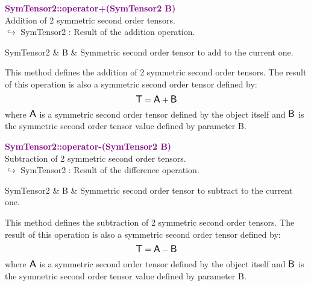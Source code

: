 \textcolor{purple}{\textbf{SymTensor2::operator+(SymTensor2 B)}}\label{SymTensor2::operator+(SymTensor2 B)}\\
Addition of 2 symmetric second order tensors.\\ \hspace*{10mm}$\hookrightarrow$ SymTensor2 : Result of the addition operation.

\begin{tcolorbox}[width=\textwidth,myArgs,tabularx={ll|R}]
SymTensor2 & B & Symmetric second order tensor to add to the current one.
\end{tcolorbox}

This method defines the addition of 2 symmetric second order tensors.
The result of this operation is also a symmetric second order tensor defined by:
\begin{equation*}
\mbox{\large\ensuremath{\mathsf{T}}} = \mbox{\large\ensuremath{\mathsf{A}}} + \mbox{\large\ensuremath{\mathsf{B}}}
\end{equation*}
where $\mbox{\large\ensuremath{\mathsf{A}}}$ is a symmetric second order tensor defined by the object itself and $\mbox{\large\ensuremath{\mathsf{B}}}$ is the symmetric second order tensor value defined by parameter B.

\textcolor{purple}{\textbf{SymTensor2::operator-(SymTensor2 B)}}\label{SymTensor2::operator-(SymTensor2 B)}\\
Subtraction of 2 symmetric second order tensors.\\ \hspace*{10mm}$\hookrightarrow$ SymTensor2 : Result of the difference operation.

\begin{tcolorbox}[width=\textwidth,myArgs,tabularx={ll|R}]
SymTensor2 & B & Symmetric second order tensor to subtract to the current one.
\end{tcolorbox}

This method defines the subtraction of 2 symmetric second order tensors.
The result of this operation is also a symmetric second order tensor defined by:
\begin{equation*}
\mbox{\large\ensuremath{\mathsf{T}}} = \mbox{\large\ensuremath{\mathsf{A}}} - \mbox{\large\ensuremath{\mathsf{B}}}
\end{equation*}
where $\mbox{\large\ensuremath{\mathsf{A}}}$ is a symmetric second order tensor defined by the object itself and $\mbox{\large\ensuremath{\mathsf{B}}}$ is the symmetric second order tensor value defined by parameter B.

